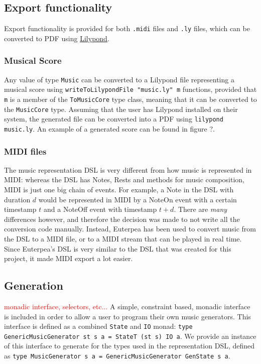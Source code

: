 \documentclass[11pt,a4paper]{article}
\newcommand{\icode}[1]{\texttt{#1}}
\newcommand\todo[1]{\textcolor{red}{#1}}
\begin{document}
\subsection{Export functionality}
Export functionality is provided for both \texttt{.midi} files and \texttt{.ly} files, which can be converted to PDF using \href{https://lilypond.org}{Lilypond}.

\subsubsection{Musical Score}
Any value of type \icode{Music} can be converted to a Lilypond file representing a musical score using \icode{writeToLilypondFile "music.ly" m} functions, provided that \icode{m} is a member of the \icode{ToMusicCore} type class, meaning that it can be converted to the \icode{MusicCore} type. Assuming that the user has Lilypond installed on their system, the generated file can be converted into a PDF using \icode{lilypond music.ly}. An example of a generated score can be found in figure ?.
\subsubsection{MIDI files}
The music representation DSL is very different from how music is represented in MIDI: whereas the DSL has Notes, Rests and methods for music composition, MIDI is just one big chain of events. For example, a Note in the DSL with duration $d$ would be represented in MIDI by a NoteOn event with a certain timestamp $t$ and a NoteOff event with timestamp $t+d$. There are \emph{many} differences however, and therefore the decision was made to not write all the conversion code manually. Instead, Euterpea has been used to convert music from the DSL to a MIDI file, or to a MIDI stream that can be played in real time. Since Euterpea's DSL is very similar to the DSL that was created for this project, it made MIDI export a lot easier.

\subsection{Generation}
\todo{monadic interface, selectors, etc...}
A simple, constraint based, monadic interface is included in order to allow a user to program their own music generators. This interface is defined as a combined \icode{State} and \icode{IO} monad: \icode{type GenericMusicGenerator st s a = StateT (st s) IO a}. We provide an instance of this interface to generate for the types used in the representation DSL, defined as \icode{type MusicGenerator s a = GenericMusicGenerator GenState s a}.
\end{document}

